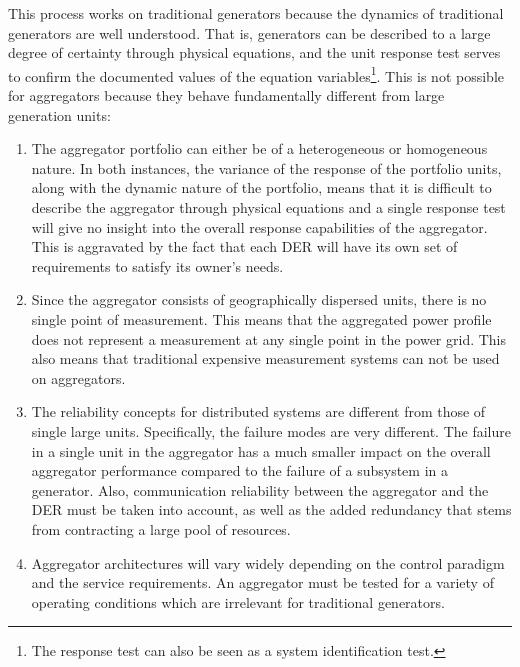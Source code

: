 This process works on traditional generators because the dynamics of traditional generators are well understood. That is, generators can be described to a large degree of certainty through physical equations, and the unit response test serves to confirm the documented values of the equation variables\footnote{The response test can also be seen as a system identification test.}. This is not possible for aggregators because they behave fundamentally different from large generation units:
\begin{enumerate}
	\item The aggregator portfolio can either be of a heterogeneous or homogeneous nature. In both instances, the variance of the response of the portfolio units, along with the dynamic nature of the portfolio, means that it is difficult to describe the aggregator through physical equations and a single response test will give no insight into the overall response capabilities of the aggregator. This is aggravated by the fact that each DER will have its own set of requirements to satisfy its owner's needs.
	\item Since the aggregator consists of geographically dispersed units, there is no single point of measurement. This means that the aggregated power profile does not represent a measurement at any single point in the power grid. This also means that traditional expensive measurement systems can not be used on aggregators.
	\item The reliability concepts for distributed systems are different from those of single large units. Specifically, the failure modes are very different. The failure in a single unit in the aggregator has a much smaller impact on the overall aggregator performance compared to the failure of a subsystem in a generator. Also, communication reliability between the aggregator and the DER must be taken into account, as well as the added redundancy that stems from contracting a large pool of resources.
	\item Aggregator architectures will vary widely depending on the control paradigm and the service requirements. An aggregator must be tested for a variety of operating conditions which are irrelevant for traditional generators.

\end{enumerate}
